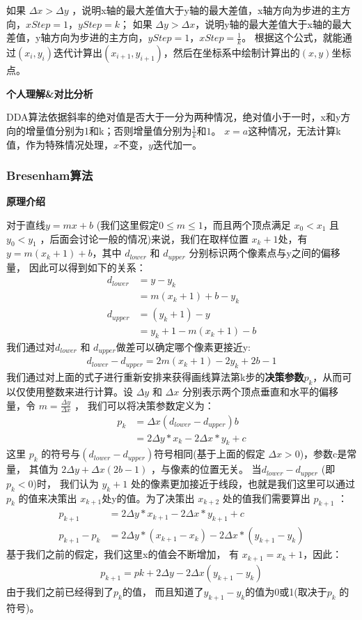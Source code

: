 \documentclass[a4paper,UTF8]{article}
\theoremstyle{definition}
\begin{document}
如果 $Δx > Δy$ ，说明x轴的最大差值大于y轴的最大差值，x轴方向为步进的主方向，$xStep = 1$，$yStep = k$；
如果 $Δy> Δx$，说明y轴的最大差值大于x轴的最大差值，y轴方向为步进的主方向，$yStep = 1$，$xStep = \frac{1}{k}$。
根据这个公式，就能通过$(x_i , y_i)$迭代计算出$(x_{i+1} , y_{i+1})$，然后在坐标系中绘制计算出的$(x,y)$坐标点。\cite{DDA}


\textbf{个人理解\&对比分析}\par
DDA算法依据斜率的绝对值是否大于一分为两种情况，绝对值小于一时，x和y方向的增量值分别为1和k；否则增量值分别为$\frac{1}{k}$和$1$。
$x=a$这种情况，无法计算k值，作为特殊情况处理，$x$不变，$y$迭代加一。



\subsubsection{Bresenham算法}
\textbf{原理介绍}\par
对于直线$y=mx + b$ (我们这里假定$0\leq m \leq 1$，而且两个顶点满足 $x_0 < x_1$ 且 $y_0 < y_1$ ，后面会讨论一般的情况)来说，我们在取样位置 $x_k+1$处，有$y = m( x_k +1) + b$，其中 $d_{lower}$ 和 $d_{upper}$ 分别标识两个像素点与y之间的偏移量，
因此可以得到如下的关系：
\begin{align}
d_{lower} &=y-y_k \\
&= m(x_k+1)+b-y_k \\
d_{upper} &=(y_k+1)-y \\
&=y_k+1-m(x_k+1)-b
\end{align}
我们通过对$d_{lower}$ 和 $d_{upper}$做差可以确定哪个像素更接近y:
\begin{align}
d_{lower}-d_{upper}=2m(x_k+1)-2y_k+2b-1
\end{align}
我们通过对上面的式子进行重新安排来获得画线算法第k步的\textbf{决策参数}$p_k$，从而可以仅使用整数来进行计算。设 $\Delta y$ 和 $\Delta x$ 
分别表示两个顶点垂直和水平的偏移量，令 $m=\frac{\Delta y}{\Delta x}$ ，
我们可以将决策参数定义为：
\begin{align}
p_k &=\Delta x(d_{lower}-d_{upper})b \\
&= 2\Delta y*x_k-2\Delta x*y_k+c
\end{align}
这里 $p_k$ 的符号与$(d_{lower}-d_{upper})$符号相同(基于上面的假定 $\Delta x>0$)，参数c是常量，
其值为 $2\Delta y+\Delta x(2b-1)$ ，与像素的位置无关。
当$d_{lower}-d_{upper}$ (即 $p_k<0$)时，
我们认为 $y_k+1$ 处的像素更加接近于线段，也就是我们这里可以通过 $p_k$ 的值来决策出 
$x_{k+1}$处y的值。为了决策出 $x_{k+2}$ 处的值我们需要算出 $p_{k+1}$ ：
\begin{align}
p_{k+1} &= 2\Delta y*x_{k+1}-2\Delta x*y_{k+1}+c \\
p_{k+1}-p_k &= 2\Delta y*(x_{k+1}-x_k)-2\Delta x*(y_{k+1}-y_k)
\end{align}
基于我们之前的假定，我们这里x的值会不断增加，
有 $x_{k+1}=x_k+1$，因此：
\begin{align}
    p_{k+1}=p{k}+2\Delta y-2\Delta x(y_{k+1}-y_k)
\end{align}
由于我们之前已经得到了$p_k$的值，
而且知道了$y_{k+1}-y_k$的值为0或1(取决于$p_k$ 的符号)。
\end{document}
